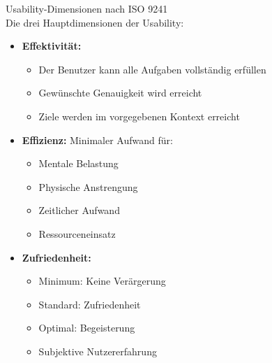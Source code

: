 \begin{definition}{Usability-Dimensionen nach ISO 9241}\\
Die drei Hauptdimensionen der Usability:
\begin{itemize}
    \item \textbf{Effektivität:}
    \begin{itemize}
        \item Der Benutzer kann alle Aufgaben vollständig erfüllen
        \item Gewünschte Genauigkeit wird erreicht
        \item Ziele werden im vorgegebenen Kontext erreicht
    \end{itemize}
    \end{itemize}

\begin{minipage}{0.5\linewidth}
    \begin{itemize}
    \item \textbf{Effizienz:} Minimaler Aufwand für:
    \begin{itemize}
        \item Mentale Belastung
        \item Physische Anstrengung
        \item Zeitlicher Aufwand
        \item Ressourceneinsatz
    \end{itemize}
    \end{itemize}
\end{minipage}
\begin{minipage}{0.5\linewidth}
    \begin{itemize}
    \item \textbf{Zufriedenheit:}
    \begin{itemize}
        \item Minimum: Keine Verärgerung
        \item Standard: Zufriedenheit
        \item Optimal: Begeisterung
        \item Subjektive Nutzererfahrung
    \end{itemize}
\end{itemize}
\end{minipage}
\end{definition}

